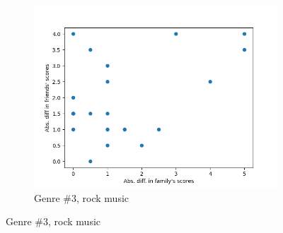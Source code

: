 \documentclass[12pt]{report}
\begin{document}
\begin{figure}[H]
\begin{centering}
\begin{subfigure}{0.3\textwidth}
  \centerline{\includegraphics[width=\textwidth,right]{Genre 3}}
  \caption{\small Genre \#3, rock music}
\end{subfigure}


\end{centering}
\end{figure}
\end{document}
